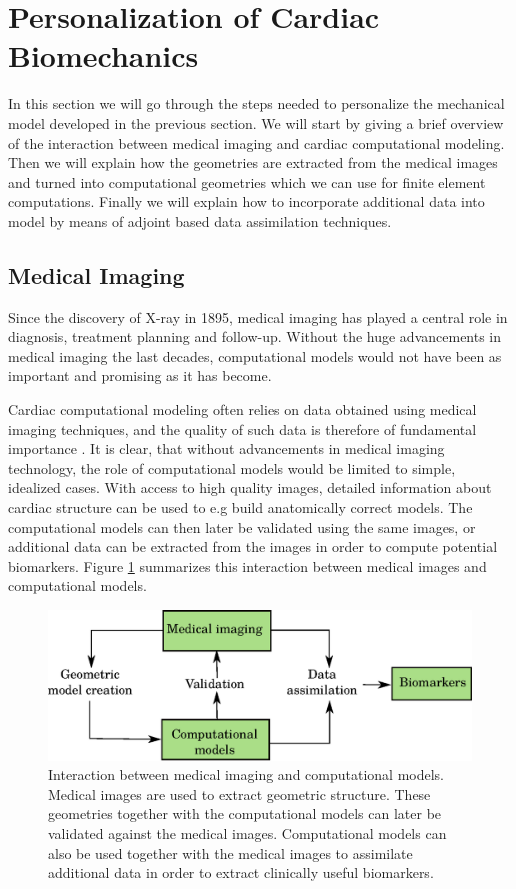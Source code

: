 \section{Personalization of Cardiac Biomechanics}
\label{sec:intro_personalization}
In this section we will go through the steps needed to personalize the
mechanical model developed in the previous section. We will start by
giving a brief overview of the interaction between medical imaging and
cardiac computational modeling. Then we will explain how the geometries
are extracted from the medical images and turned into computational
geometries which we can use for finite element computations. Finally we
will explain how to incorporate additional data into model by means of
adjoint based data assimilation techniques.


\subsection{Medical Imaging}

Since the discovery of X-ray in 1895, medical imaging has played a central
role in diagnosis, treatment planning and follow-up. Without the huge
advancements in medical imaging the last decades, computational models
would not have been as important and promising as it has become.


Cardiac computational modeling often relies on data obtained using
medical imaging techniques, and the quality of such data is therefore of
fundamental importance \cite{lamata2014images}. It is clear, that
without advancements in medical imaging technology, the role of
computational models would be limited to simple, idealized cases. With
access to high quality images, detailed information about cardiac structure
can be used to e.g build anatomically correct models. The
computational models can then later be validated using the same
images, or additional data can be extracted from the images in order to
compute potential biomarkers. Figure \ref{fig:cardiac_imaging_model} summarizes
this interaction between medical images and computational models. 

\begin{figure}[htbp]
  \centering
    \includegraphics[width=\textwidth]{chapters/introduction/figures/models.eps}
\caption{Interaction between medical imaging and computational
  models. Medical images are used to extract geometric
  structure. These geometries together with the computational models
  can later be validated against the medical images. Computational
  models can also be used together with the medical images to
  assimilate additional data in order to extract clinically useful
  biomarkers. }
\label{fig:cardiac_imaging_model}
\end{figure}



